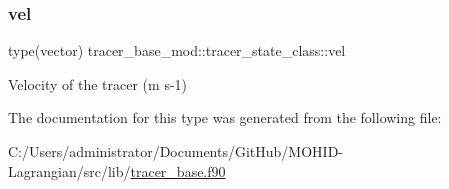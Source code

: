 \subsubsection{\texorpdfstring{vel}{vel}}
{\footnotesize\ttfamily type(vector) tracer\+\_\+base\+\_\+mod\+::tracer\+\_\+state\+\_\+class\+::vel\hspace{0.3cm}{\ttfamily [private]}}



Velocity of the tracer (m s-\/1) 



The documentation for this type was generated from the following file\+:\begin{DoxyCompactItemize}
\item 
C\+:/\+Users/administrator/\+Documents/\+Git\+Hub/\+M\+O\+H\+I\+D-\/\+Lagrangian/src/lib/\hyperlink{tracer__base_8f90}{tracer\+\_\+base.\+f90}\end{DoxyCompactItemize}
